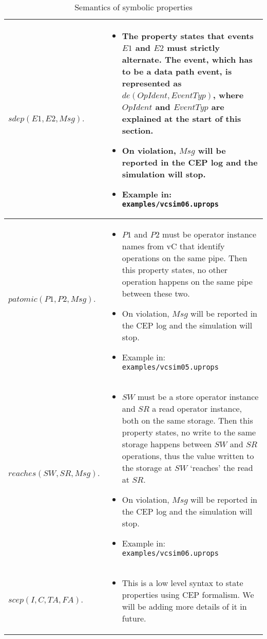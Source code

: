 \documentclass[12pt,a4paper]{article}
\begin{document}
\begin{table}[H]
\begin{tabular}{lp{.8\linewidth}}

$sdep(E1,E2,Msg).$ &
\vspace{-.7cm}

\begin{itemize}
\item The property states that events $E1$ and $E2$ must strictly alternate. The event, which has to be a data path event, is represented as $de(OpIdent,EventTyp)$, where $OpIdent$ and $EventTyp$ are explained at the start of this section.
\item On violation, $Msg$ will be reported in the CEP log and the simulation will stop.
\item Example in: \texttt{examples/vcsim06.uprops}
\end{itemize} \\\hline

$patomic(P1,P2,Msg).$ &
\vspace{-.7cm}

\begin{itemize}
\item $P1$ and $P2$ must be operator instance names from vC that identify operations on the same pipe. Then this property states, no other operation happens on the same pipe between these two.
\item On violation, $Msg$ will be reported in the CEP log and the simulation will stop.
\item Example in: \texttt{examples/vcsim05.uprops}
\end{itemize}\\\hline

$reaches(SW,SR,Msg).$ &
\vspace{-.7cm}

\begin{itemize}
\item $SW$ must be a store operator instance and $SR$ a read operator instance, both on the same storage. Then this property states, no write to the same storage happens between $SW$ and $SR$ operations, thus the value written to the storage at $SW$ `reaches' the read at $SR$.
\item On violation, $Msg$ will be reported in the CEP log and the simulation will stop.
\item Example in: \texttt{examples/vcsim06.uprops}
\end{itemize}\\\hline

$scep(I,C,TA,FA).$ &
\vspace{-.7cm}

\begin{itemize}
\item This is a low level syntax to state properties using CEP formalism. We will be adding more details of it in future.
\end{itemize}\\

\end{tabular}
\caption{Semantics of symbolic properties}
\label{Tab:PropSemantics}
\end{table}
\end{document}

